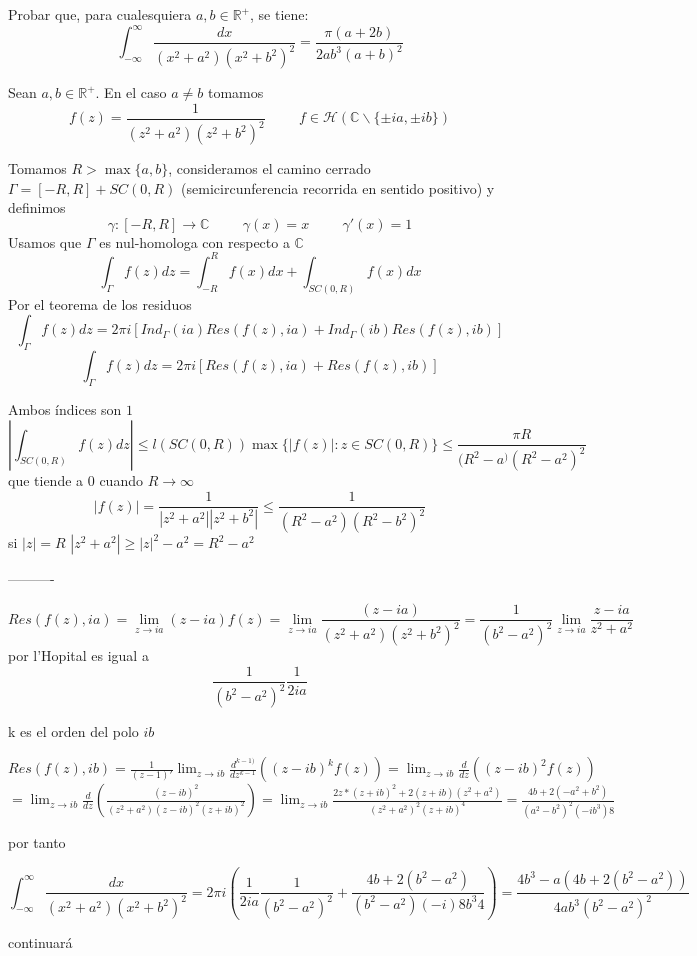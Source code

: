 \begin{ejer}
	Probar que, para cualesquiera $a,b\in\mathbb{R}^+$, se tiene:
	$$ \int_{-\infty}^{\infty} \frac{dx}{(x^2+a^2)(x^2+b^2)^2} = \frac{\pi (a+2b)}{2ab^3(a+b)^2} $$
\end{ejer}
\begin{sol}
Sean $a,b\in\mathbb{R}^+$.
En el caso $a\not = b$ tomamos $$f(z) = \frac{1}{(z^2+a^2)(z^2+b^2)^2} \hspace{1cm} f\in\mathcal{H}( \mathbb{C}\backslash\{ \pm ia, \pm ib \} )$$

Tomamos $R>\max\{a,b\}$, consideramos el camino cerrado $\Gamma = [-R,R]+SC(0,R)$ (semicircunferencia recorrida en sentido positivo) y definimos
$$\gamma : [-R,R]\rightarrow \mathbb{C} \hspace{1cm} \gamma(x)=x \hspace{1cm} \gamma '(x) = 1$$
Usamos que $\Gamma$ es nul-homologa con respecto a $\mathbb{C}$
$$\int_{\Gamma}f(z)dz = \int_{-R}^{R} f(x)dx + \int_{SC(0,R)} f(x)dx$$
Por el teorema de los residuos 
$$\int_{\Gamma}f(z)dz = 2\pi i [ Ind_{\Gamma}(ia)Res(f(z),ia) + Ind_{\Gamma}(ib)Res(f(z),ib) ]$$
$$\int_{\Gamma}f(z)dz = 2\pi i [Res(f(z),ia) + Res(f(z),ib) ]$$

Ambos índices son $1$
$$|\int_{SC(0,R)} f(z)dz| \leq l(SC(0,R))\max \{ |f(z)| : z\in SC(0,R) \} \leq \frac{\pi R}{(R^2-a^)(R^2-a^2)^2}$$
que tiende a $0$ cuando $R\rightarrow \infty$
$$|f(z)| = \frac{1}{|z^2+a^2||z^2+b^2|} \leq \frac{1}{(R^2-a^2)(R^2-b^2)^2}$$
si $|z|=R$
$|z^2+a^2| \geq |z|^2 -a^2 = R^2-a^2$

----------

$$Res(f(z),ia) = \lim_{z\rightarrow ia} (z-ia)f(z) = \lim_{z\rightarrow ia} \frac{(z-ia)}{(z^2+a^2)(z^2+b^2)^2} = \frac{1}{(b^2-a^2)^2} \lim_{z\rightarrow ia} \frac{z-ia}{z^2+a^2}$$ 
por l'Hopital es igual a
$$\frac{1}{(b^2-a^2)^2}\frac{1}{2ia}$$

k es el orden del polo $ib$

$Res(f(z),ib) = \frac{1}{(z-1)'} \lim_{z\rightarrow ib} \frac{d^{k-1)}}{dz^{k-1}} ((z-ib)^k f(z)) = \lim_{z\rightarrow ib} \frac{d}{dz} ((z-ib)^2 f(z)) $
$= \lim_{z\rightarrow ib} \frac{d}{dz} \left( \frac{(z-ib)^2}{(z^2+a^2)(z-ib)^2(z+ib)^2}  \right) 
= \lim_{z\rightarrow ib}\frac{2z*(z+ib)^2 + 2(z+ib)(z^2+a^2)}{(z^2+a^2)^2 (z+ib)^4}
= \frac{4b + 2(-a^2+b^2)}{(a^2-b^2)^2 (-ib^3)8}  $

por tanto

$$ \int_{-\infty}^{\infty} \frac{dx}{(x^2+a^2)(x^2+b^2)^2} = 
2\pi i \left( \frac{1}{2ia}\frac{1}{(b^2-a^2)^2} + \frac{4b+2(b^2-a^2)}{(b^2-a^2)(-i)8b^3 4} \right) =
\frac{4b^3-a(4b+2(b^2-a^2))}{4ab^3(b^2-a^2)^2}$$

continuará

\end{sol}


